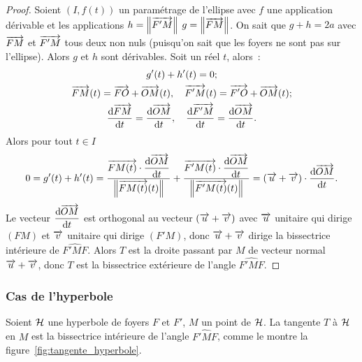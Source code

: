 \begin{proof}
  Soient \((I, f(t))\) un paramétrage de l'ellipse avec \(f\) une 
  application dérivable et les applications \(h = \left\lVert\overrightarrow{F'M}\right\rVert\) 
  \(g = \left\lVert\overrightarrow{FM}\right\rVert\). On sait que \(g + h = 2a\) avec \(\overrightarrow{FM}\) et 
  \(\overrightarrow{F'M}\) tous deux non nuls (puisqu'on sait que les foyers ne 
  sont pas sur l'ellipse). Alors \(g\) et \(h\) sont dérivables. Soit un 
  réel \(t\), alors~:
  \begin{gather}
    g'(t) + h'(t) = 0; \\
    \overrightarrow{FM}(t) = \overrightarrow{FO} + \overrightarrow{OM}(t), \quad 
    \overrightarrow{F'M}(t) = \overrightarrow{F'O} + \overrightarrow{OM}(t);\\
    \dfrac{\mathrm{d} \overrightarrow{FM}}{\mathrm{d} t} = \dfrac{\mathrm{d} \overrightarrow{OM}}{\mathrm{d} t}, \quad 
    \dfrac{\mathrm{d} \overrightarrow{F'M}}{\mathrm{d} t} = \dfrac{\mathrm{d} \overrightarrow{OM}}{\mathrm{d} t}.
  \end{gather}
  Alors pour tout \(t \in I\)
  \begin{equation}
    0 = g'(t) + h'(t) = 
    \frac{\overrightarrow{FM(t)}\cdot\dfrac{\mathrm{d} \overrightarrow{OM}}{\mathrm{d} t}}{\left\lVert\overrightarrow{FM(t)}(t)\right\rVert} + 
    \frac{\overrightarrow{F'M(t)}\cdot\dfrac{\mathrm{d} \overrightarrow{OM}}{\mathrm{d} t}}{\left\lVert\overrightarrow{F'M(t)}(t)\right\rVert} = 
    (\overrightarrow{u} + \overrightarrow{v})\cdot \dfrac{\mathrm{d} \overrightarrow{OM}}{\mathrm{d} t}.
  \end{equation}
  Le vecteur \(\dfrac{\mathrm{d} \overrightarrow{OM}}{\mathrm{d} t}\) est orthogonal au vecteur 
  \((\overrightarrow{u} + \overrightarrow{v})\) avec \(\overrightarrow{u}\) unitaire qui dirige \((FM)\) 
  et \(\overrightarrow{v}\) unitaire qui dirige \((F'M)\), donc 
  \(\overrightarrow{u} + \overrightarrow{v}\) dirige la bissectrice intérieure de 
  \(\widehat{F'MF}\). Alors \(T\) est la droite passant par \(M\) de 
  vecteur normal \(\overrightarrow{u} + \overrightarrow{v}\), donc \(T\) est la bissectrice 
  extérieure de l'angle \(\widehat{F'MF}\).
\end{proof}

\subsubsection{Cas de l'hyperbole}

\begin{prop}
  Soient \(\mathcal{H}\) une hyperbole de foyers \(F\) et \(F'\), \(M\) un point 
  de \(\mathcal{H}\). La tangente \(T\) à \(\mathcal{H}\) en \(M\) est la bissectrice 
  intérieure de l'angle \(\widehat{F'MF}\), comme le montre la 
  figure~\ref{fig:tangente_hyperbole}.
\end{prop}

